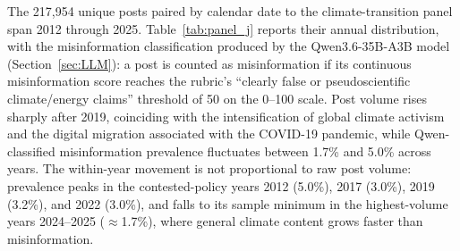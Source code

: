 \documentclass{article}
\theoremstyle{plain}
\begin{document}
The 217,954 unique posts paired by calendar date to the climate-transition panel span 2012 through 2025. Table~\ref{tab:panel_j} reports their annual distribution, with the misinformation classification produced by the Qwen3.6-35B-A3B model (Section~\ref{sec:LLM}): a post is counted as misinformation if its continuous misinformation score reaches the rubric's ``clearly false or pseudoscientific climate/energy claims'' threshold of 50 on the 0--100 scale. Post volume rises sharply after 2019, coinciding with the intensification of global climate activism and the digital migration associated with the COVID-19 pandemic, while Qwen-classified misinformation prevalence fluctuates between 1.7\% and 5.0\% across years. The within-year movement is not proportional to raw post volume: prevalence peaks in the contested-policy years 2012 (5.0\%), 2017 (3.0\%), 2019 (3.2\%), and 2022 (3.0\%), and falls to its sample minimum in the highest-volume years 2024--2025 ($\approx$1.7\%), where general climate content grows faster than misinformation.
\end{document}
